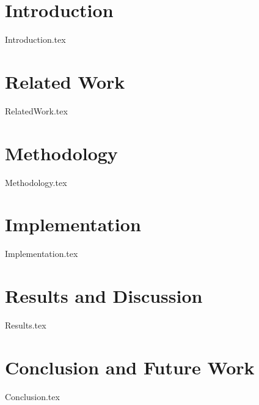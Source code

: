 \documentclass{EPL-master-thesis-covers-EN}
\begin{document}
\begin{abstract}
These results demonstrate that benchmark performance alone is an insufficient basis for clinical deployment decisions. For Saint-Luc, M4* offers the best trade-off between coverage, concept precision, and SNOMED validity guarantees, all without transmitting patient data to external servers.


    \end{abstract}



    \tableofcontents
    \newpage
    \hypersetup{pageanchor=true}

    \chapter{Introduction}
    {Introduction.tex}

    \chapter{Related Work}
    {RelatedWork.tex}

    \chapter{Methodology}
    {Methodology.tex}

    \chapter{Implementation}
    {Implementation.tex}

    \chapter{Results and Discussion}
    {Results.tex}

    \chapter{Conclusion and Future Work}
    {Conclusion.tex}

    \listoffigures
    \listoftables

    \printglossary[nonumberlist]
\end{document}
